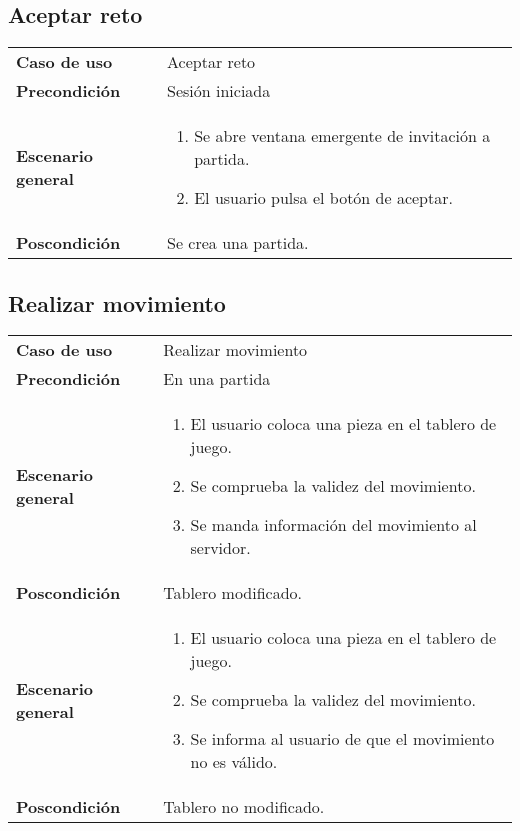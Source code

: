 \subsection{Aceptar reto}
{\footnotesize
\begin{tabularx}{0.95\textwidth}{p{}|X}

\textbf{Caso de uso} & Aceptar reto \\

\textbf{Precondición} & Sesión iniciada \\

\textbf{Escenario general} & \begin{enumerate}
\item Se abre ventana emergente de invitación a partida.
\item El usuario pulsa el botón de aceptar.

\end{enumerate} \\

\textbf{Poscondición} & Se crea una partida.

\end{tabularx}
}

\subsection{Realizar movimiento}
{\footnotesize
\begin{tabularx}{0.95\textwidth}{p{}|X}

\textbf{Caso de uso} & Realizar movimiento \\

\textbf{Precondición} & En una partida \\

\textbf{Escenario general} & \begin{enumerate}
\item El usuario coloca una pieza en el tablero de juego.
\item Se comprueba la validez del movimiento.
\item Se manda información del movimiento al servidor.

\end{enumerate} \\

\textbf{Poscondición} & Tablero modificado.\\

\textbf{Escenario general} & \begin{enumerate}
\item El usuario coloca una pieza en el tablero de juego.
\item Se comprueba la validez del movimiento.
\item Se informa al usuario de que el movimiento no es válido.

\end{enumerate} \\

\textbf{Poscondición} & Tablero no modificado.

\end{tabularx}
}

